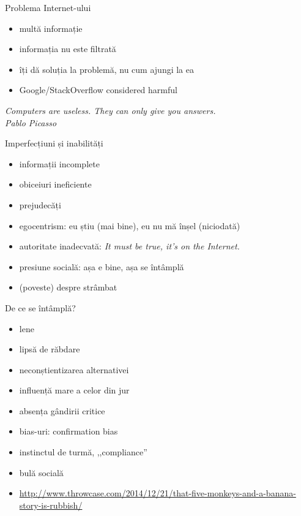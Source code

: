 \documentclass{simple}
\begin{document}
\begin{frame}{Problema Internet-ului}
  \begin{itemize}
    \pause \item multă informație
    \item informația nu este filtrată
    \pause \item îți dă soluția la problemă, nu cum ajungi la ea
    \pause \item Google/StackOverflow considered harmful
  \end{itemize}
  \pause
  \vspace{1cm}
  \centering
  \textit{Computers are useless. They can only give you answers.}\\
  \vspace{3mm}
  \hfill \textit{Pablo Picasso}
\end{frame}

\begin{frame}{Imperfecțiuni și inabilități}
  \begin{itemize}
    \pause \item informații incomplete
    \pause \item obiceiuri ineficiente
    \pause \item prejudecăți
    \pause \item egocentrism: eu știu (mai bine), eu nu mă înșel (niciodată)
    \pause \item autoritate inadecvată: \textit{It must be true, it's on the Internet.}
    \pause \item presiune socială: așa e bine, așa se întâmplă
    \pause \item (poveste) despre strâmbat
  \end{itemize}
\end{frame}

\begin{frame}{De ce se întâmplă?}
  \begin{itemize}
    \pause \item lene
    \pause \item lipsă de răbdare
    \pause \item neconștientizarea alternativei
    \pause \item influență mare a celor din jur
    \pause \item absența gândirii critice
    \pause \item bias-uri: confirmation bias
    \pause \item instinctul de turmă, ,,compliance''
    \pause \item bulă socială
    \pause \item \url{http://www.throwcase.com/2014/12/21/that-five-monkeys-and-a-banana-story-is-rubbish/}
  \end{itemize}
\end{frame}
\end{document}
